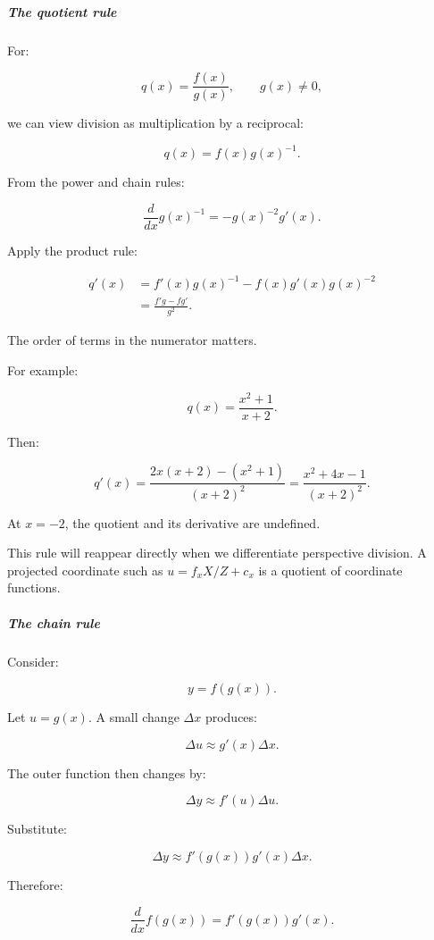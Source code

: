 \subparagraph{The quotient rule}\label{01-foundations-i-ch020-the-quotient-rule}

\hypertarget{01-foundations-i-ch020-the-quotient-rule}{}

For:

\[
q(x)=\frac{f(x)}{g(x)},\qquad g(x)\ne0,
\]

we can view division as multiplication by a reciprocal:

\[
q(x)=f(x)g(x)^{-1}.
\]

From the power and chain rules:

\[
\frac d{dx}g(x)^{-1} =-g(x)^{-2}g'(x).
\]

Apply the product rule:

\[
\begin{aligned} q'(x) &=f'(x)g(x)^{-1} -f(x)g'(x)g(x)^{-2}\\ &=\boxed{\frac{f'g-fg'}{g^2}}. \end{aligned}
\]

The order of terms in the numerator matters.

For example:

\[
q(x)=\frac{x^2+1}{x+2}.
\]

Then:

\[
q'(x)= \frac{2x(x+2)-(x^2+1)}{(x+2)^2} = \frac{x^2+4x-1}{(x+2)^2}.
\]

At \(x=-2\), the quotient and its derivative are undefined.

This rule will reappear directly when we differentiate perspective division. A projected coordinate such as \(u=f_xX/Z+c_x\) is a quotient of coordinate functions.

\subparagraph{The chain rule}\label{01-foundations-i-ch020-the-chain-rule}

\hypertarget{01-foundations-i-ch020-the-chain-rule}{}

Consider:

\[
y=f(g(x)).
\]

Let \(u=g(x)\). A small change \(\Delta x\) produces:

\[
\Delta u\approx g'(x)\Delta x.
\]

The outer function then changes by:

\[
\Delta y\approx f'(u)\Delta u.
\]

Substitute:

\[
\Delta y\approx f'(g(x))g'(x)\Delta x.
\]

Therefore:

\[
\boxed{\frac d{dx}f(g(x))=f'(g(x))g'(x)}.
\]

